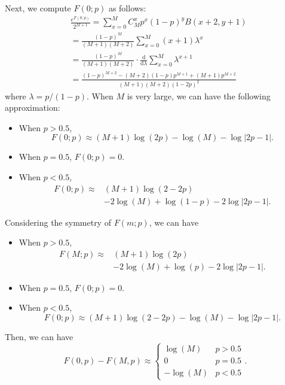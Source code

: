 \documentclass{article}
\begin{document}
Next, we compute $F(0;p)$ as follows:
\begin{equation*}
\begin{split}
&\frac{e^{F(0;p)}}{2^{M+1}}=\sum_{x=0}^{M}C_{M}^{x}p^{x}(1-p)^{y}B(x+2,y+1)\\
&=\frac{(1-p)^{M}}{(M+1)(M+2)}\sum_{x=0}^{M}(x+1)\lambda^{x}\\
&=\frac{(1-p)^{M}}{(M+1)(M+2)}\cdot \frac{\mathrm{d}}{\mathrm{d}\lambda}\sum_{x=0}^{M}\lambda^{x+1}\\
&=\frac{(1-p)^{M+2}-(M+2)(1-p)p^{M+1}+(M+1)p^{M+2}}{(M+1)(M+2)(1-2p)^2}
\end{split}
\end{equation*}
where $\lambda=p/(1-p)$. When $M$ is very large, we can have the following approximation:
\begin{itemize}
\item When $p>0.5$, 
\begin{equation*}
F(0;p)\approx (M+1)\log(2p)-\log(M)-\log|2p-1|.
\end{equation*}
\item When $p=0.5$, $F(0;p)=0$.
\item When $p<0.5$,
\begin{equation*}
\begin{split}
F(0;p)\approx &(M+1)\log(2-2p)\\
&-2\log(M)+\log(1-p)-2\log|2p-1|.
\end{split}
\end{equation*}
\end{itemize}
Considering the symmetry of $F(m;p)$, we can have
\begin{itemize}
\item When $p>0.5$, 
\begin{equation*}
\begin{split}
F(M;p)\approx &(M+1)\log(2p)\\
&-2\log(M)+\log(p)-2\log|2p-1|.
\end{split}
\end{equation*}
\item When $p=0.5$, $F(0;p)=0$.
\item When $p<0.5$,
\begin{equation*}
F(0;p)\approx (M+1)\log(2-2p)-\log(M)-\log|2p-1|.
\end{equation*}
\end{itemize}
Then, we can have
\begin{equation}
   F(0,p)-F(M,p)\approx
    \left\{
    \begin{array}{cl}
    \log(M) & p>0.5\\
    0 & p=0.5\\
    -\log(M) & p<0.5
    \end{array}\right..
\end{equation}
\end{document}
